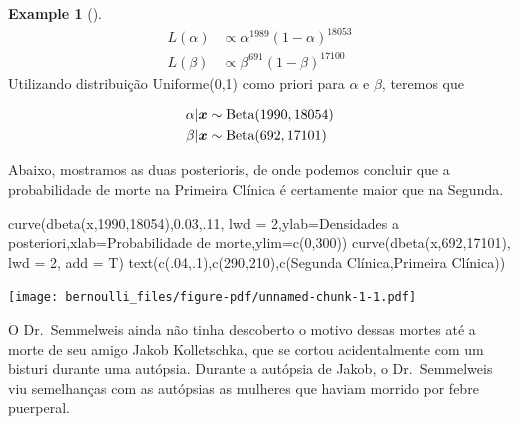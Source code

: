 \documentclass[
  letterpaper,
  DIV=11,
  numbers=noendperiod]{scrreprt}
\newenvironment{Shaded}{\begin{snugshade}}{\end{snugshade}}
\newcommand{\AttributeTok}[1]{\textcolor[rgb]{0.40,0.45,0.13}{#1}}
\newcommand{\DecValTok}[1]{\textcolor[rgb]{0.68,0.00,0.00}{#1}}
\newcommand{\FloatTok}[1]{\textcolor[rgb]{0.68,0.00,0.00}{#1}}
\newcommand{\FunctionTok}[1]{\textcolor[rgb]{0.28,0.35,0.67}{#1}}
\newcommand{\NormalTok}[1]{\textcolor[rgb]{0.00,0.23,0.31}{#1}}
\newcommand{\StringTok}[1]{\textcolor[rgb]{0.13,0.47,0.30}{#1}}
\theoremstyle{plain}
\theoremstyle{definition}
\newtheorem{example}{Example}[chapter]
\theoremstyle{definition}
\theoremstyle{remark}
\begin{document}
\begin{example}[]
\[\begin{align}L(\alpha)&\propto \alpha^{1989} (1-\alpha)^{18053}\\L(\beta)&\propto \beta^{691} (1-\beta)^{17100}\end{align}\]
Utilizando distribuição Uniforme(0,1) como priori para \(\alpha\) e
\(\beta\), teremos que

\[\begin{align}\alpha|\boldsymbol{x}&\sim \hbox{Beta}(1990,18054) \\\beta|\boldsymbol{x}&\sim \hbox{Beta}(692,17101)\end{align}\]

Abaixo, mostramos as duas posterioris, de onde podemos concluir que a
probabilidade de morte na Primeira Clínica é certamente maior que na
Segunda.

\begin{Shaded}
\begin{Highlighting}[]
\FunctionTok{curve}\NormalTok{(}\FunctionTok{dbeta}\NormalTok{(x,}\DecValTok{1990}\NormalTok{,}\DecValTok{18054}\NormalTok{),}\FloatTok{0.03}\NormalTok{,.}\DecValTok{11}\NormalTok{, }\AttributeTok{lwd =} \DecValTok{2}\NormalTok{,}\AttributeTok{ylab=}\StringTok{\textquotesingle{}Densidades a posteriori\textquotesingle{}}\NormalTok{,}\AttributeTok{xlab=}\StringTok{\textquotesingle{}Probabilidade de morte\textquotesingle{}}\NormalTok{,}\AttributeTok{ylim=}\FunctionTok{c}\NormalTok{(}\DecValTok{0}\NormalTok{,}\DecValTok{300}\NormalTok{))}
\FunctionTok{curve}\NormalTok{(}\FunctionTok{dbeta}\NormalTok{(x,}\DecValTok{692}\NormalTok{,}\DecValTok{17101}\NormalTok{), }\AttributeTok{lwd =} \DecValTok{2}\NormalTok{, }\AttributeTok{add =}\NormalTok{ T)}
\FunctionTok{text}\NormalTok{(}\FunctionTok{c}\NormalTok{(.}\DecValTok{04}\NormalTok{,.}\DecValTok{1}\NormalTok{),}\FunctionTok{c}\NormalTok{(}\DecValTok{290}\NormalTok{,}\DecValTok{210}\NormalTok{),}\FunctionTok{c}\NormalTok{(}\StringTok{\textquotesingle{}Segunda Clínica\textquotesingle{}}\NormalTok{,}\StringTok{\textquotesingle{}Primeira Clínica\textquotesingle{}}\NormalTok{))}
\end{Highlighting}
\end{Shaded}

\texttt{[image: bernoulli\_files/figure-pdf/unnamed-chunk-1-1.pdf]}

O Dr.~Semmelweis ainda não tinha descoberto o motivo dessas mortes até a
morte de seu amigo Jakob Kolletschka, que se cortou acidentalmente com
um bisturi durante uma autópsia. Durante a autópsia de Jakob, o
Dr.~Semmelweis viu semelhanças com as autópsias as mulheres que haviam
morrido por febre puerperal.


\end{example}
\end{document}
